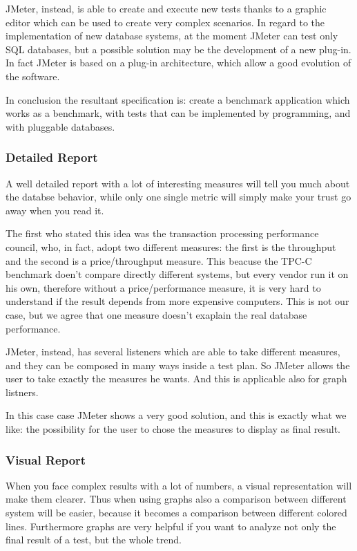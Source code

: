 JMeter, instead, is able to create and execute new tests thanks to a graphic editor which can be used to create very complex scenarios. In regard to the implementation of new database systems, at the moment JMeter can test only SQL databases, but a possible solution may be the development of a new plug-in. In fact JMeter is based on a plug-in architecture, which allow a good evolution of the software.

In conclusion the resultant specification is: create a benchmark application which works as a benchmark, with tests that can be implemented by programming, and with pluggable databases.
			 
			\subsubsection{Detailed Report} 
A well detailed report with a lot of interesting measures will tell you much about the databse behavior, while only one single metric will simply make your trust go away when you read it. 

The first who stated this idea was the transaction processing performance council, who, in fact, adopt two different measures: the first is the throughput and the second is a price/throughput measure. This beacuse the TPC-C benchmark doen't compare directly different systems, but every vendor run it on his own, therefore without a price/performance measure, it is very hard to understand if the result depends from more expensive computers. This is not our case, but we agree that one measure doesn't exaplain the real database performance.

JMeter, instead, has several listeners which are able to take different measures, and they can be composed in many ways inside a test plan. So JMeter allows the user to take exactly the measures he wants. And this is applicable also for graph listners.

In this case case JMeter shows a very good solution, and this is exactly what we like: the possibility for the user to chose the measures to display as final result.
			
			\subsubsection{Visual Report}
When you face complex results with a lot of numbers, a visual representation will make them clearer. Thus when using graphs also a comparison between different system will be easier, because it becomes a comparison between different colored lines. Furthermore graphs are very helpful if you want to analyze not only the final result of a test, but the whole trend.

